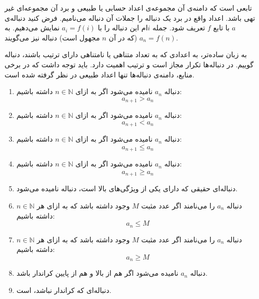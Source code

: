 
\begin{DEFINITION}
	\p
{}
تابعی است که دامنه‌ی آن مجموعه‌ی اعداد حسابی یا طبیعی و برد آن مجموعه‌ای غیر تهی باشد.
اعداد واقع در برد یک دنباله را جملات آن دنباله می‌نامیم.
فرض کنید دنباله‌ی
$a$
با تابع
$f$
تعریف شود.
جمله
$i$ام
این دنباله را با
$a_i = f(i)$
نمایش می‌دهیم.
به 
$a_n = f(n)$
(که در آن $n$ مجهول است)
دنباله نیز می‌گویند.
\end{DEFINITION}

\p
به زبان ساده‌تر، به اعدادی که به تعداد متناهی یا نامتناهی دارای ترتیب باشند، دنباله
گوییم. در دنباله‌ها تکرار مجاز است و ترتیب اهمیت دارد.
باید توجه داشت که در برخی منابع، دامنه‌ی دنباله‌ها تنها اعداد طبیعی در نظر گرفته شده است.

\begin{DEFINITION}
\begin{enumerate}
\item
 دنباله
$a_n$
  نامیده می‌شود اگر به ازای
$n \in \mathbb{N}$
 داشته باشیم:
$$a_{n+1} > a_n$$

\item
 دنباله
$a_n$
  نامیده می‌شود اگر به ازای
$n \in \mathbb{N}$
 داشته باشیم:
$$a_{n+1} < a_n$$

\item
 دنباله
$a_n$
  نامیده می‌شود اگر به ازای
$n \in \mathbb{N}$
 داشته باشیم:
$$a_{n+1} \leq a_n$$

\item
 دنباله
$a_n$
  نامیده می‌شود اگر به ازای
$n \in \mathbb{N}$
 داشته باشیم:
$$a_{n+1} \geq a_n$$

\item
 دنباله‌ای حقیقی  که دارای یکی از ویژگی‌های بالا است، دنباله 
 نامیده می‌شود.

\item
 دنباله
$a_n$
 را  
  می‌نامند اگر عدد مثبت 
 $M$
 وجود داشته باشد که به ازای هر
$n \in \mathbb{N}$
 داشته باشیم:
$$a_{n} \leq M$$

\item
 دنباله
$a_n$
 را 
  می‌نامند اگر عدد مثبت 
 $M$
 وجود داشته باشد که به ازای هر
$n \in \mathbb{N}$
 داشته باشیم:
$$a_{n} \geq M$$

\item
 دنباله
$a_n$
 نامیده می‌شود اگر هم از بالا و هم از پایین کراندار باشد.

\item
دنباله‌ای که کراندار نباشد، 
 است.
\end{enumerate}
\end{DEFINITION}

